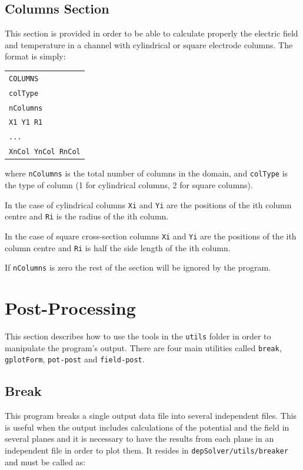 \documentclass[12pt]{report}
\begin{document}
\section{Columns Section}
This section is provided in order to be able to calculate properly the electric field and temperature in a channel with cylindrical or square electrode columns. The format is simply:

\begin{tabular}{l}
\texttt{COLUMNS}\\
\texttt{colType}\\
\texttt{nColumns}\\
\texttt{X1 Y1 R1}\\
\texttt{...}\\
\texttt{XnCol YnCol RnCol}
\end{tabular}

where \verb+nColumns+ is the total number of columns in the domain, and \verb+colType+ is the type of column (1 for cylindrical columns, 2 for square columns).

In the case of cylindrical columns \verb+Xi+ and \verb+Yi+ are the positions of the ith column centre and \verb+Ri+ is the radius of the ith column.

In the case of square cross-section columns \verb+Xi+ and \verb+Yi+ are the positions of the ith column centre and \verb+Ri+ is half the side length of the ith column.

If \verb+nColumns+ is zero the rest of the section will be ignored by the program.

\pagebreak
\section*{}
\pagebreak

\chapter{Post-Processing}
This section describes how to use the tools in the \verb+utils+ folder in order to manipulate the program's output. There are four main utilities called \verb+break+, \verb+gplotForm+, \verb+pot-post+ and \verb+field-post+.

\section{Break}\label{break}
This program breaks a single output data file into several independent files. This is useful when the output includes calculations of the potential and the field in several planes and it is necessary to have the results from each plane in an independent file in order to plot them. It resides in \verb+depSolver/utils/breaker+ and must be called as:
\end{document}
